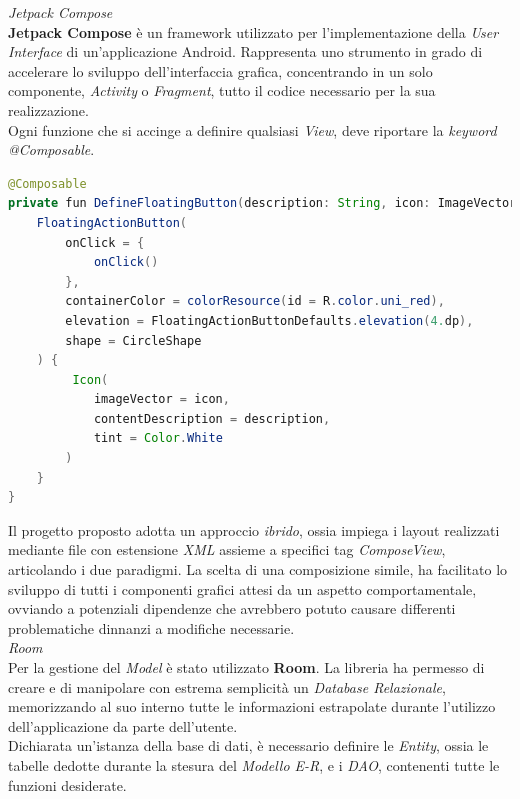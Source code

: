 \documentclass{article}
\begin{document}
    \textit{Jetpack Compose} \vspace{7pt}\\
    \textbf{Jetpack Compose} è un framework utilizzato per l'implementazione della \textit{User Interface} di un'applicazione Android.
    Rappresenta uno strumento in grado di accelerare lo sviluppo dell'interfaccia grafica, concentrando in un solo componente,
    \textit{Activity} o \textit{Fragment}, tutto il codice necessario per la sua realizzazione. \vspace{7pt}\\
    Ogni funzione che si accinge a definire qualsiasi \textit{View}, deve riportare la \textit{keyword @Composable}. 
    \begin{lstlisting}[language=Java]
@Composable
private fun DefineFloatingButton(description: String, icon: ImageVector, onClick: () -> Unit) {
    FloatingActionButton(
        onClick = {
            onClick()
        },
        containerColor = colorResource(id = R.color.uni_red),
        elevation = FloatingActionButtonDefaults.elevation(4.dp),
        shape = CircleShape
    ) {
         Icon(
            imageVector = icon,
            contentDescription = description,
            tint = Color.White
        )
    }
}
    \end{lstlisting}
    Il progetto proposto adotta un approccio \textit{ibrido}, ossia impiega i layout realizzati mediante file con estensione \textit{XML} assieme a specifici tag \textit{ComposeView}, articolando i due paradigmi. La scelta di una composizione simile, ha facilitato lo sviluppo di tutti i componenti grafici attesi da un aspetto comportamentale, ovviando a potenziali dipendenze che avrebbero potuto causare differenti problematiche dinnanzi a modifiche necessarie. \vspace{7pt}\\
    \textit{Room} \vspace{7pt}\\
    Per la gestione del \textit{Model} è stato utilizzato \textbf{Room}. La libreria ha permesso di creare e di manipolare con estrema semplicità un \textit{Database Relazionale}, memorizzando al suo interno tutte le informazioni estrapolate durante l'utilizzo dell'applicazione da parte dell'utente. \vspace{7pt}\\
    Dichiarata un'istanza della base di dati, è necessario definire le \textit{Entity}, ossia le tabelle dedotte durante la stesura del \textit{Modello E-R}, e i \textit{DAO}, contenenti tutte le funzioni desiderate. \vspace{7pt}\\
\end{document}
